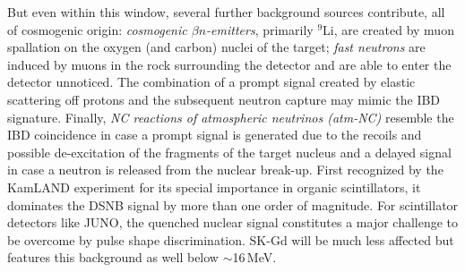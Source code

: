 But even within this window, several further background sources contribute, all of cosmogenic origin: {\it cosmogenic $\beta n$-emitters}, primarily $^9$Li, are created by muon spallation on the oxygen (and carbon) nuclei of the target; {\it fast neutrons} are induced by muons in the rock surrounding the detector and are able to enter the detector unnoticed. The combination of a prompt signal created by elastic scattering off protons and the subsequent neutron capture may mimic the IBD signature. Finally,  {\it NC reactions of atmospheric neutrinos (atm-NC)} resemble the IBD coincidence in case a prompt signal is generated due to the recoils and possible de-excitation of the fragments of the target nucleus and a delayed signal in case a neutron is released from the nuclear break-up. First recognized by the KamLAND experiment for its special importance in organic scintillators, it dominates the DSNB signal by more than one order of magnitude. For scintillator detectors like JUNO, the quenched nuclear signal constitutes a major challenge to be overcome by pulse shape discrimination. SK-Gd will be much less affected but features this background as well below $\sim$16\,MeV.



